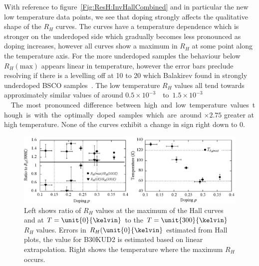 With reference to figure~\ref{Fig:ResH:InvHallCombined} and in particular the new low temperature data points, we see that doping strongly affects the qualitative shape of the $R_H$ curves. The curves have a temperature dependence which is stronger on the underdoped side which gradually becomes less pronounced as doping increases, however all curves show a maximum in $R_H$ at some point along the temperature axis. For the more underdoped samples the behaviour below $R_H(\textrm{max})$ appears linear in temperature, however the error bars preclude resolving if there is a levelling off at \unit{10}{\kelvin} to \unit{20}{\kelvin} which Balakirev \etal{} found in strongly underdoped \ac{BSCO} samples~\cite{Balakirev2003}. The low temperature $R_H$ values all tend towards approximately similar values of around \unit{$0.5\times 10^{-3}$}{\centi\metre\cubed\per\coulomb} to \unit{$1.5\times 10^{-3}$}{\centi\metre\cubed\per\coulomb}. The most pronounced difference between high and low temperature values though is with the optimally doped samples which are around $\times 2.75$ greater at high temperature. None of the curves exhibit a change in sign right down to \unit{0}{\kelvin}. 


\begin{figure}[htbp]
    \begin{center}
        \includegraphics[scale=0.8]{Chapter-HallBSCO/Figures/RhRatios/RhRatios}
        \caption{Left shows ratio of $R_H$ values at the maximum of the Hall curves and at $T=\unit{0}{\kelvin}$ to the $T=\unit{300}{\kelvin}$ $R_H$ values. Errors in $R_H(\unit{0}{\kelvin}$ estimated from Hall plots, the value for B30KUD2 is estimated based on linear extrapolation. Right shows the temperature where the maximum $R_H$ occurs.}
        \label{Fig:ResH:RhRatios}
    \end{center}
\end{figure}

